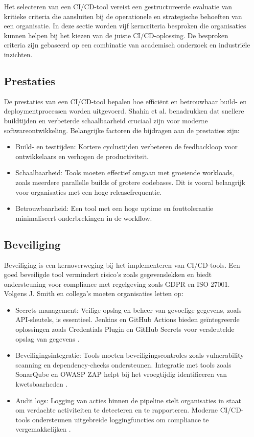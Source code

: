 Het selecteren van een CI/CD-tool vereist een gestructureerde evaluatie van kritieke criteria die aansluiten bij de operationele en strategische behoeften van een organisatie. In deze sectie worden vijf kerncriteria besproken die organisaties kunnen helpen bij het kiezen van de juiste CI/CD-oplossing. De besproken criteria zijn gebaseerd op een combinatie van academisch onderzoek en industriële inzichten.

\subsection{Prestaties}
De prestaties van een CI/CD-tool bepalen hoe efficiënt en betrouwbaar build- en deploymentprocessen worden uitgevoerd. Shahin et al. \autocite{shahin2017} benadrukken dat snellere buildtijden en verbeterde schaalbaarheid cruciaal zijn voor moderne softwareontwikkeling.
Belangrijke factoren die bijdragen aan de prestaties zijn: \begin{itemize} \item Build- en testtijden: Kortere cyclustijden verbeteren de feedbackloop voor ontwikkelaars en verhogen de productiviteit. \item Schaalbaarheid: Tools moeten effectief omgaan met groeiende workloads, zoals meerdere parallelle builds of grotere codebases. Dit is vooral belangrijk voor organisaties met een hoge releasefrequentie. \autocite{springer2023ci} \item Betrouwbaarheid: Een tool met een hoge uptime en fouttolerantie minimaliseert onderbrekingen in de workflow. \autocite{ieee2021cicd} \end{itemize}

\subsection{Beveiliging}
Beveiliging is een kernoverweging bij het implementeren van CI/CD-tools. Een goed beveiligde tool vermindert risico's zoals gegevenslekken en biedt ondersteuning voor compliance met regelgeving zoals GDPR en ISO 27001. Volgens J. Smith en collega's \autocite{smith2023securityci} moeten organisaties letten op:
\begin{itemize} 
    \item Secrets management: Veilige opslag en beheer van gevoelige gegevens, zoals API-sleutels, is essentieel. Jenkins en GitHub Actions bieden geïntegreerde oplossingen zoals Credentials Plugin en GitHub Secrets voor versleutelde opslag van gegevens \autocite{githubdocs2023secrets}.
    \item Beveiligingsintegratie: Tools moeten beveiligingscontroles zoals vulnerability scanning en dependency-checks ondersteunen. Integratie met tools zoals SonarQube en OWASP ZAP helpt bij het vroegtijdig identificeren van kwetsbaarheden \autocite{owasp2023}.
    \item Audit logs: Logging van acties binnen de pipeline stelt organisaties in staat om verdachte activiteiten te detecteren en te rapporteren. Moderne CI/CD-tools ondersteunen uitgebreide loggingfuncties om compliance te vergemakkelijken \autocite{forsgren2018}.
\end{itemize}

